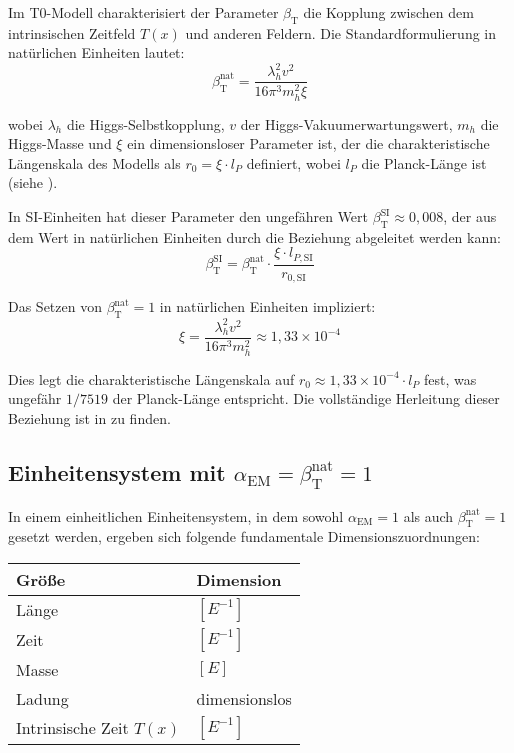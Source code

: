 \documentclass[12pt,a4paper]{article}
\newcommand{\Tfield}{T(x)}
\newcommand{\alphaEM}{\alpha_{\text{EM}}}
\newcommand{\betaT}{\beta_{\text{T}}}
\begin{document}
	Im T0-Modell charakterisiert der Parameter \(\betaT\) die Kopplung zwischen dem intrinsischen Zeitfeld \(\Tfield\) und anderen Feldern. Die Standardformulierung in natürlichen Einheiten lautet:
	\begin{equation}
		\betaT^{\text{nat}} = \frac{\lambda_h^2 v^2}{16\pi^3 m_h^2 \xi}
	\end{equation}
	
	wobei \(\lambda_h\) die Higgs-Selbstkopplung, \(v\) der Higgs-Vakuumerwartungswert, \(m_h\) die Higgs-Masse und \(\xi\) ein dimensionsloser Parameter ist, der die charakteristische Längenskala des Modells als \(r_0 = \xi \cdot l_P\) definiert, wobei \(l_P\) die Planck-Länge ist (siehe \cite{pascher_params_2025}).
	
	In SI-Einheiten hat dieser Parameter den ungefähren Wert \(\betaT^{\text{SI}} \approx 0,008\), der aus dem Wert in natürlichen Einheiten durch die Beziehung abgeleitet werden kann:
	\begin{equation}
		\betaT^{\text{SI}} = \betaT^{\text{nat}} \cdot \frac{\xi \cdot l_{P,\text{SI}}}{r_{0,\text{SI}}}
	\end{equation}
	
	Das Setzen von \(\betaT^{\text{nat}} = 1\) in natürlichen Einheiten impliziert:
	\begin{equation}
		\xi = \frac{\lambda_h^2 v^2}{16\pi^3 m_h^2} \approx 1,33 \times 10^{-4}
	\end{equation}
	
	Dies legt die charakteristische Längenskala auf \(r_0 \approx 1,33 \times 10^{-4} \cdot l_P\) fest, was ungefähr \(1/7519\) der Planck-Länge entspricht. Die vollständige Herleitung dieser Beziehung ist in \cite{pascher_params_2025} zu finden.
	
	\subsection{Einheitensystem mit \(\alphaEM = \betaT^{\text{nat}} = 1\)}
	\label{subsec:unified_system}
	
	In einem einheitlichen Einheitensystem, in dem sowohl \(\alphaEM = 1\) als auch \(\betaT^{\text{nat}} = 1\) gesetzt werden, ergeben sich folgende fundamentale Dimensionszuordnungen:
	
	\begin{tcolorbox}[colback=blue!5!white,colframe=blue!75!black,title=Dimensionale Zuordnungen im einheitlichen Einheitensystem]
		\begin{tabular}{ll}
			\textbf{Größe} & \textbf{Dimension} \\
			\hline
			Länge & \([E^{-1}]\) \\
			Zeit & \([E^{-1}]\) \\
			Masse & \([E]\) \\
			Ladung & dimensionslos \\
			Intrinsische Zeit \(\Tfield\) & \([E^{-1}]\) \\
		\end{tabular}
	\end{tcolorbox}
	
\end{document}
